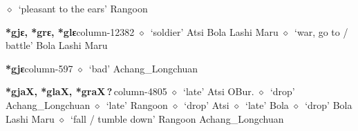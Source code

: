          $\diamond$~`pleasant to the ears'
         Rangoon 
  \item {\footnotesize \textbf{*gjɛ, *grɛ, *glɛ}}{\tiny column-12382}
         $\diamond$~`soldier'
         Atsi 
\hspace{1ex}
         Bola 
\hspace{1ex}
         Lashi 
\hspace{1ex}
         Maru 
\hspace{1ex}
         $\diamond$~`war, go to / battle'
         Bola 
\hspace{1ex}
         Lashi 
\hspace{1ex}
         Maru 
  \item {\footnotesize \textbf{*gjɛ}}{\tiny column-597}
         $\diamond$~`bad'
         Achang\_Longchuan 
  \item {\footnotesize \textbf{*gjaX, *glaX, *graX\,?\,}}{\tiny column-4805}
         $\diamond$~`late'
         Atsi 
\hspace{1ex}
         OBur. 
\hspace{1ex}
         $\diamond$~`drop'
         Achang\_Longchuan 
\hspace{1ex}
         $\diamond$~`late'
         Rangoon 
\hspace{1ex}
         $\diamond$~`drop'
         Atsi 
\hspace{1ex}
         $\diamond$~`late'
         Bola 
\hspace{1ex}
         $\diamond$~`drop'
         Bola 
\hspace{1ex}
         Lashi 
\hspace{1ex}
         Maru 
\hspace{1ex}
         $\diamond$~`fall / tumble down'
         Rangoon 
\hspace{1ex}
         Achang\_Longchuan 
